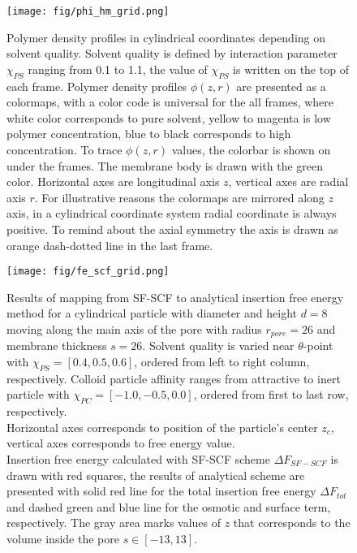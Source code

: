 \documentclass[12pt, a4paper]{article}
\begin{document}
\begin{figure}
    \centering
    \texttt{[image: fig/phi\_hm\_grid.png]}
    \caption{
    Polymer density profiles in cylindrical coordinates depending on solvent quality. 
    Solvent quality is defined by interaction parameter $\chi_{PS}$ ranging from 0.1 to 1.1, the value of $\chi_{PS}$ is written on the top of each frame.
    Polymer density profiles $\phi(z,r)$ are presented as a colormaps, with a color code is universal for the all frames, where white color corresponds to pure solvent, yellow to magenta is low polymer concentration, blue to black corresponds to high concentration.
    To trace $\phi(z,r)$ values, the colorbar is shown on under the frames.
    The membrane body is drawn with the green color.
    Horizontal axes are longitudinal axis $z$, vertical axes are radial axis $r$.
    For illustrative reasons the colormaps are mirrored along $z$ axis, in a cylindrical coordinate system radial coordinate is always positive.
    To remind about the axial symmetry the axis is drawn as orange dash-dotted line in the last frame.
    }
    \label{fig:phi_hm_grid}
\end{figure}

\begin{figure}
    \centering
    \texttt{[image: fig/fe\_scf\_grid.png]}
    \caption{
    Results of mapping from SF-SCF to analytical insertion free energy method for a cylindrical particle with diameter and height $d=8$ moving along the main axis of the pore with radius $r_{pore} = 26$ and membrane thickness $s=26$.
    Solvent quality is varied near $\theta$-point with $\chi_{PS} = [0.4, 0.5, 0.6]$, ordered from left to right column, respectively.
    Colloid particle affinity ranges from attractive to inert particle with $\chi_{PC} = [-1.0, -0.5, 0.0]$, ordered from first to last row, respectively.
    \\
    Horizontal axes corresponds to position of the particle's center $z_c$, vertical axes corresponds to free energy value.
    \\
    Insertion free energy calculated with SF-SCF scheme $\Delta F_{SF-SCF}$ is drawn with red squares, the results of analytical scheme are presented with solid red line for the total insertion free energy $\Delta F_{tot}$ and dashed green and blue line for the osmotic and surface term, respectively.
    The gray area marks values of $z$ that corresponds to the volume inside the pore $s\in [-13, 13]$.
    \label{fig:fe_scf_grid}
    }
\end{figure}
\end{document}
